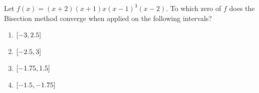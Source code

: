 \documentclass[../../Assignments.tex]{subfiles}
\begin{document}
\begin{exercise}
    Let \(f(x) = (x + 2) (x+1) x (x - 1)^3 (x - 2)\). To which zero of \(f\)
    does the Bisection method converge when applied on the following intervals?

    \begin{multicols}{2}
        \begin{enumerate}[label = (\alph*)]
            \item \(\interval{-3}{\num{2.5}}\)
            \item \(\interval{\num{-2.5}}{3}\)
            \item \(\interval{\num{-1.75}}{\num{1.5}}\)
            \item \(\interval{\num{-1.5}}{\num{-1.75}}\)
        \end{enumerate}
    \end{multicols}
\end{exercise}
\end{document}
